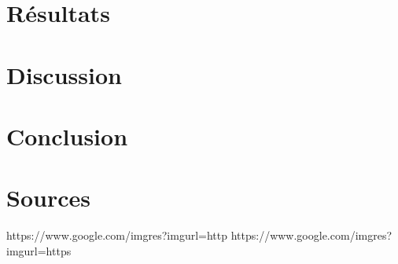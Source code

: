 \documentclass[a4paper,10pt]{article}
\begin{document}
\section{Résultats}

\section{Discussion}

\section{Conclusion}

\section{Sources}

https://www.google.com/imgres?imgurl=http%
https://www.google.com/imgres?imgurl=https%
\end{document}
